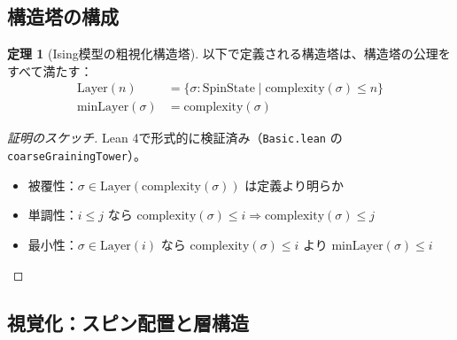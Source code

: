 \documentclass[a4paper,12pt]{ltjsarticle}
\theoremstyle{definition}
\newtheorem{theorem}{定理}[section]
\newcommand{\Layer}{\mathrm{Layer}}
\newcommand{\minLayer}{\mathrm{minLayer}}
\begin{document}
\subsection{構造塔の構成}

\begin{theorem}[Ising模型の粗視化構造塔]
以下で定義される構造塔は、構造塔の公理をすべて満たす：
\begin{align*}
\Layer(n) &= \{ \sigma : \mathrm{SpinState} \mid \mathrm{complexity}(\sigma) \leq n \} \\
\minLayer(\sigma) &= \mathrm{complexity}(\sigma)
\end{align*}
\end{theorem}

\begin{proof}[証明のスケッチ]
Lean 4で形式的に検証済み（\texttt{Basic.lean} の \texttt{coarseGrainingTower}）。
\begin{itemize}
  \item 被覆性：$\sigma \in \Layer(\mathrm{complexity}(\sigma))$ は定義より明らか
  \item 単調性：$i \leq j$ なら $\mathrm{complexity}(\sigma) \leq i \Rightarrow \mathrm{complexity}(\sigma) \leq j$
  \item 最小性：$\sigma \in \Layer(i)$ なら $\mathrm{complexity}(\sigma) \leq i$ より $\minLayer(\sigma) \leq i$
\end{itemize}
\end{proof}

\subsection{視覚化：スピン配置と層構造}
\end{document}
